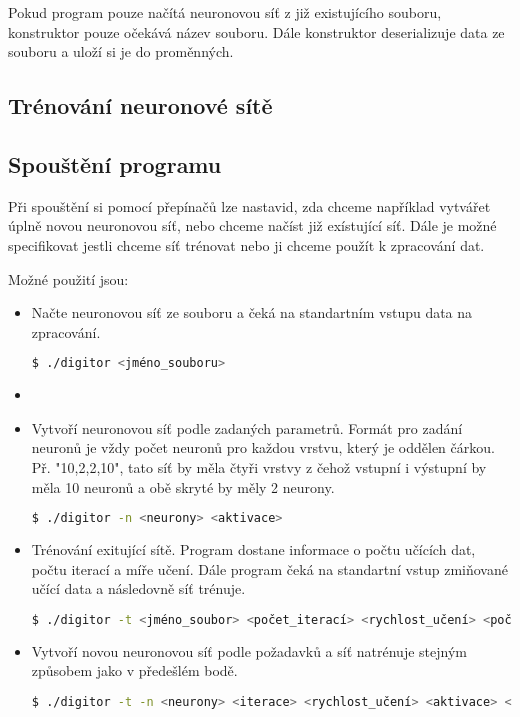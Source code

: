 Pokud program pouze načítá neuronovou síť z již existujícího souboru, konstruktor pouze očekává název souboru.
Dále konstruktor deserializuje data ze souboru a uloží si je do proměnných.

\subsection{Trénování neuronové sítě}

\subsection{Spouštění programu}
Při spouštění si pomocí přepínačů lze nastavid, zda chceme například vytvářet úplně novou neuronovou síť, nebo chceme načíst již exístující síť.
Dále je možné specifikovat jestli chceme síť trénovat nebo ji chceme použít k zpracování dat.

Možné použití jsou:
\begin{itemize}
    \item Načte neuronovou síť ze souboru a čeká na standartním vstupu data na zpracování.
    \begin{lstlisting}[language=bash]
              $ ./digitor <jméno_souboru>
    \end{lstlisting}

    \item \item Vytvoří neuronovou síť podle zadaných parametrů.
    Formát pro zadání neuronů je vždy počet neuronů pro každou vrstvu, který je oddělen čárkou.
    Př. "10,2,2,10", tato síť by měla čtyři vrstvy z čehož vstupní i výstupní by měla 10 neuronů a obě skryté by měly 2 neurony.
    \begin{lstlisting}[language=bash]
              $ ./digitor -n <neurony> <aktivace>
    \end{lstlisting}

    \item Trénování exitující sítě. Program dostane informace o počtu učících dat, počtu iterací a míře učení.
    Dále program čeká na standartní vstup zmiňované učící data a následovně síť trénuje.
    \begin{lstlisting}[language=bash]
              $ ./digitor -t <jméno_soubor> <počet_iterací> <rychlost_učení> <počet_dávek> <počet_dat>
    \end{lstlisting}

    \item Vytvoří novou neuronovou síť podle požadavků a síť natrénuje stejným způsobem jako v předešlém bodě.
    \begin{lstlisting}[language=bash]
              $ ./digitor -t -n <neurony> <iterace> <rychlost_učení> <aktivace> <počet_dávek> <počet_dat>
    \end{lstlisting}
\end{itemize}
